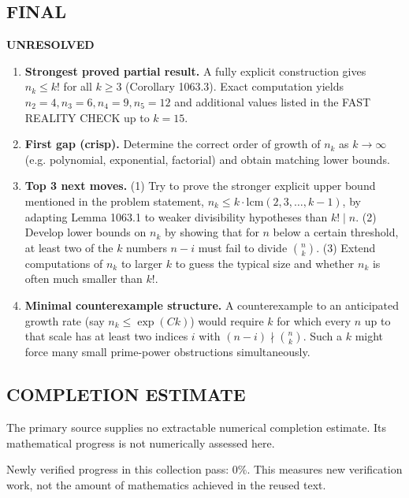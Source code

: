 \subsection*{FINAL}
\textbf{UNRESOLVED}
\begin{enumerate}
\item[(i)] \textbf{Strongest proved partial result.}
A fully explicit construction gives $n_k\le k!$ for all $k\ge 3$ (Corollary 1063.3). Exact computation yields $n_2=4,n_3=6,n_4=9,n_5=12$ and additional values listed in the FAST REALITY CHECK up to $k=15$.
\item[(ii)] \textbf{First gap (crisp).}
Determine the correct order of growth of $n_k$ as $k\to\infty$ (e.g. polynomial, exponential, factorial) and obtain matching lower bounds.
\item[(iii)] \textbf{Top 3 next moves.}
(1) Try to prove the stronger explicit upper bound mentioned in the problem statement, $n_k\le k\cdot \mathrm{lcm}(2,3,\dots,k-1)$, by adapting Lemma 1063.1 to weaker divisibility hypotheses than $k!\mid n$.
(2) Develop lower bounds on $n_k$ by showing that for $n$ below a certain threshold, at least two of the $k$ numbers $n-i$ must fail to divide $\binom{n}{k}$.
(3) Extend computations of $n_k$ to larger $k$ to guess the typical size and whether $n_k$ is often much smaller than $k!$.
\item[(iv)] \textbf{Minimal counterexample structure.}
A counterexample to an anticipated growth rate (say $n_k\le \exp(Ck)$) would require $k$ for which every $n$ up to that scale has at least two indices $i$ with $(n-i)\nmid \binom{n}{k}$. Such a $k$ might force many small prime-power obstructions simultaneously.
\end{enumerate}


\subsection*{COMPLETION ESTIMATE}
The primary source supplies no extractable numerical completion estimate. Its mathematical progress is not numerically assessed here.

Newly verified progress in this collection pass: $0\%$. This measures new verification work, not the amount of mathematics achieved in the reused text.
